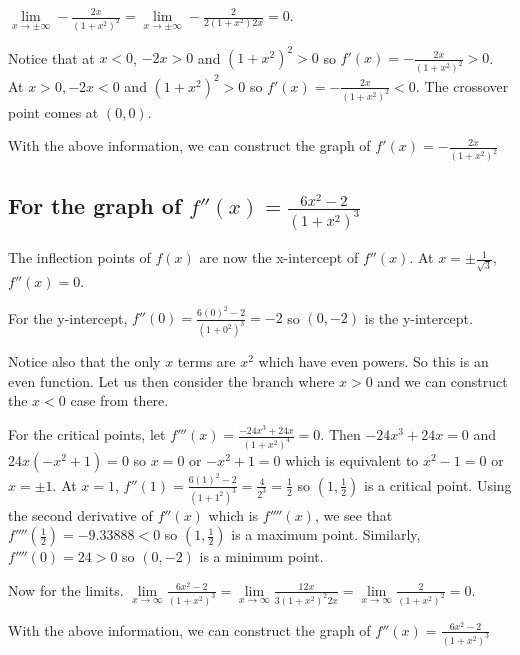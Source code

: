 \documentclass[9pt]{article}
\begin{document}
$\lim\limits_{x \rightarrow \pm\infty} -\frac{2x}{(1 + x^2)^2} = \lim\limits_{x \rightarrow \pm\infty} -\frac{2}{2(1 + x^2)2x} = 0$.

Notice that at $x < 0$, $-2x > 0$ and $(1 + x^2)^2 > 0$ so $f'(x) = -\frac{2x}{(1 + x^2)^2} > 0$. At $x > 0, -2x < 0$ and $(1 + x^2)^2 > 0$ so $f'(x) = -\frac{2x}{(1 + x^2)^2} < 0$. The crossover point comes at $(0, 0)$.

With the above information, we can construct the graph of $f'(x) = -\frac{2x}{(1 + x^2)^2}$

\subsection*{For the graph of $f''(x) = \frac{6x^2 - 2}{(1 + x^2)^3}$}

The inflection points of $f(x)$ are now the x-intercept of $f''(x)$. At $x = \pm \frac{1}{\sqrt{3}}$, $f''(x) = 0$.

For the y-intercept, $f''(0) = \frac{6(0)^2 - 2}{(1 + 0^2)^3} = -2$ so $(0, -2)$ is the y-intercept.

Notice also that the only $x$ terms are $x^2$ which have even powers. So this is an even function. Let us then consider the branch where $x > 0$ and we can construct the $x < 0$ case from there.

For the critical points, let $f'''(x) = \frac{-24x^3 + 24x}{(1 + x^2)^4} = 0$. Then $-24x^3 + 24x = 0$ and $24x(- x^2 + 1) = 0$ so $x = 0$ or $-x^2 + 1 = 0$ which is equivalent to $x^2 - 1 = 0$ or $x = \pm 1$. At $x = 1$, $f''(1) = \frac{6(1)^2 - 2}{(1 + 1^2)^3} = \frac{4}{2^3} = \frac{1}{2}$ so $(1, \frac{1}{2})$ is a critical point. Using the second derivative of $f''(x)$ which is $f''''(x)$, we see that $f''''(\frac{1}{2}) = -9.33888 < 0$ so $(1, \frac{1}{2})$ is a maximum point. Similarly, $f''''(0) = 24 > 0$ so $(0, -2)$ is a minimum point.

Now for the limits. $\lim\limits_{x \rightarrow \infty}\frac{6x^2 - 2}{(1 + x^2)^3} = \lim\limits_{x \rightarrow \infty}\frac{12x}{3(1 + x^2)^2 2x} = \lim\limits_{x \rightarrow \infty}\frac{2}{(1 + x^2)^2} = 0$.

With the above information, we can construct the graph of $f''(x) = \frac{6x^2 - 2}{(1 + x^2)^3}$
\end{document}
